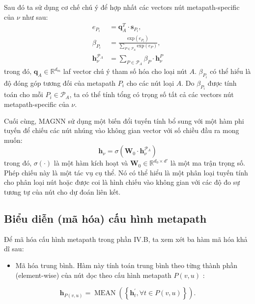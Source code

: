 Sau đó ta sử dụng cơ chế chú ý để  hợp nhất các vectors nút metapath-specific của $\nu$ như sau:
\begin{equation}
  \begin{split}
    e_{P_i} &= \mathbf{q}^T_A \cdot \mathbf{s}_{P_i}, \\
    \beta _{P_i} &= \frac{\text{exp}(e_{P_i})}{\sum_{P \in \pmb{\mathcal{P}}_A} \text{exp}(e_{P})}, \\
    \mathbf{h}^{\pmb{\mathcal{P}}_A}_{\nu} &= \sum_{P \in \pmb{\mathcal{P}}_A} \beta _{P} \cdot \mathbf{h}^P_{\nu}
  \end{split}
\end{equation}
trong đó, $\mathbf{q}_A \in \mathbb{R}^{d_m}$ laf vector chú ý tham số hóa cho loại nút $A$. $\beta _{P_i}$ có thể hiểu là độ đóng góp tương đối của metapath $P_i$ cho các nút loại $A$. Do $\beta _{P_i}$ được tính toán cho mỗi $P_i \in \pmb{\mathcal{P}}_A$, ta có thể tính tổng có trọng số tất cả các vectors nút metapath-specific của $\nu$.

Cuối cùng, MAGNN sử dụng một biến đổi tuyến tính bổ sung với một hàm phi tuyến để chiếu các nút nhúng vào không gian vector với số chiều đầu ra mong muốn:
\begin{equation}
  \mathbf{h}_{\nu} = \sigma \left( \mathbf{W}_0 \cdot \mathbf{h}^{\pmb{\mathcal{P}}_A}_{\nu} \right)
\end{equation}
trong đó, $\sigma (\cdot)$ là một hàm kích hoạt và $\mathbf{W}_0 \in \mathbb{R}^{d_0 \times d'}$ là một ma trận trọng số. Phép chiếu này là một tác vụ cụ thể. Nó có thể hiểu là một phân loại tuyến tính cho phân loại nút hoặc được coi là hình chiếu vào không gian với các độ đo sự tương tự của nút cho dự đoán liên kết. 

\subsection{Biểu diễn (mã hóa) cấu hình metapath}
Để mã hóa cấu hình metapath trong phần IV.B, ta xem xét ba hàm mã hóa khả dĩ sau: 

\begin{itemize}
  \item Mã hóa trung bình. Hàm này tính toán trung bình theo từng thành phần (element-wise) của nút dọc theo cấu hình metapath $P(v, u)$ :
\end{itemize}
\begin{equation}
  \mathbf{h}_{P(v, u)}=\operatorname{MEAN}\left(\left\{\mathbf{h}_{t}^{\prime}, \forall t \in P(v, u)\right\}\right).
\end{equation}

